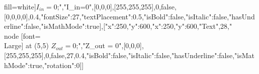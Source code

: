 fill=white]{$I_{in}=0$};","I_{in}=0",[0,0,0],[255,255,255],0,false,[0,0,0,0],0.4,{"fontSize":27,"textPlacement":0.5,"isBold":false,"isItalic":false,"hasUnderline":false,"isMathMode":true}],[{"x":250,"y":600},{"x":250,"y":600},"Text",28,"\\node [font=\\Large] at (5,5) {$Z_{out} = 0$};","Z_{out} = 0",[0,0,0],[255,255,255],0,false,27,0.4,{"isBold":false,"isItalic":false,"hasUnderline":false,"isMathMode":true,"rotation":0}]]